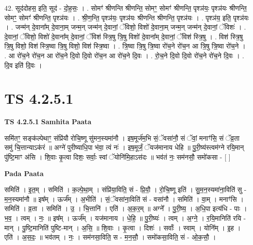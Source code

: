 \documentclass[17pt]{extarticle}
\begin{document}
42. सूद॑दोहस॒ इति॒ सूद॑ - दो॒ह॒सः॒ । . सोमꣳ॑ श्रीणन्ति श्रीणन्ति॒ सोमꣳ॒॒ सोमꣳ॑ श्रीणन्ति॒ पृश्ञ॑यः॒ पृश्ञ॑यः श्रीणन्ति॒ सोमꣳ॒॒ सोमꣳ॑ श्रीणन्ति॒ पृश्ञ॑यः । . श्री॒ण॒न्ति॒ पृश्ञ॑यः॒ पृश्ञ॑यः श्रीणन्ति श्रीणन्ति॒ पृश्ञ॑यः । . पृश्ञ॑य॒ इति॒ पृश्ञ॑यः । . जन्म॑न् दे॒वाना᳚म् दे॒वाना॒म् जन्म॒न् जन्म॑न् दे॒वानां॒ ॅविशो॒ विशो॑ दे॒वाना॒म् जन्म॒न् जन्म॑न् दे॒वानां॒ ॅविशः॑ । . दे॒वानां॒ ॅविशो॒ विशो॑ दे॒वाना᳚म् दे॒वानां॒ ॅविश॑ स्त्रि॒षु त्रि॒षु विशो॑ दे॒वाना᳚म् दे॒वानां॒ ॅविश॑ स्त्रि॒षु । . विश॑ स्त्रि॒षु त्रि॒षु विशो॒ विश॑ स्त्रि॒ष्वा त्रि॒षु विशो॒ विश॑ स्त्रि॒ष्वा । . त्रि॒ष्वा त्रि॒षु त्रि॒ष्वा रो॑च॒ने रो॑च॒न आ त्रि॒षु त्रि॒ष्वा रो॑च॒ने । . आ रो॑च॒ने रो॑च॒न आ रो॑च॒ने दि॒वो दि॒वो रो॑च॒न आ रो॑च॒ने दि॒वः । . रो॒च॒ने दि॒वो दि॒वो रो॑च॒ने रो॑च॒ने दि॒वः । . दि॒व इति॑ दि॒वः । \newline
\pagebreak
{}

\section{ TS 4.2.5.1 }

\textbf{TS 4.2.5.1 } \newline
\textbf{Samhita Paata} \newline

समि॑तꣳ॒॒ सङ्क॑ल्पेथाꣳ॒॒ संप्रि॑यौ रोचि॒ष्णू सु॑मन॒स्यमा॑नौ । इष॒मूर्ज॑म॒भि सं॒ॅवसा॑नौ॒ सं ॅवां॒ मनाꣳ॑सि॒ सं ॅव्र॒ता समु॑ चि॒त्तान्याऽक॑रं ॥ अग्ने॑ पुरीष्याधि॒पा भ॑वा॒ त्वं नः॑ । इष॒मूर्जं॒ ॅयज॑मानाय धेहि ॥ पु॒री॒ष्य॑स्त्वम॑ग्ने रयि॒मान् पु॑ष्टि॒माꣳ अ॑सि । शि॒वाः कृ॒त्वा दिशः॒ सर्वाः॒ स्वां ॅयोनि॑मि॒हाऽस॑दः ॥ भव॑तं नः॒ सम॑नसौ॒ समो॑कसा - [  ] \newline

\textbf{Pada Paata} \newline

समिति॑ । इ॒त॒म् । समिति॑ । क॒ल्पे॒था॒म् । संप्रि॑या॒विति॒ सं - प्रि॒यौ॒ । रो॒चि॒ष्णू इति॑ । सु॒म॒न॒स्यमा॑ना॒विति॑ सु - म॒न॒स्यमा॑नौ ॥ इष᳚म् । ऊर्ज᳚म् । अ॒भीति॑ । सं॒ॅवसा॑ना॒विति॑ सं - वसा॑नौ । समिति॑ । वा॒म् । मनाꣳ॑सि । समिति॑ । व्र॒ता । समिति॑ । उ॒ । चि॒त्तानि॑ । एति॑ । अ॒क॒र॒म् ॥ अग्ने᳚ । पु॒री॒ष्य॒ । अ॒धि॒पा इत्य॑धि - पाः । भ॒व॒ । त्वम् । नः॒ ॥ इष᳚म् । ऊर्ज᳚म् । यज॑मानाय । धे॒हि॒ ॥ पु॒री॒ष्यः॑ । त्वम् । अ॒ग्ने॒ । र॒यि॒मानिति॑ रयि - मान् । पु॒ष्टि॒मानिति॑ पुष्टि-मान् । अ॒सि॒ ॥ शि॒वाः । कृ॒त्वा । दिशः॑ । सर्वाः᳚ । स्वाम् । योनि᳚म् । इ॒ह । एति॑ । अ॒स॒दः॒ ॥ भव॑तम् । नः॒ । सम॑नसा॒विति॒ स - म॒न॒सौ॒ । समो॑कसा॒विति॒ सं - ओ॒क॒सौ॒ ।  \newline
\end{document}
